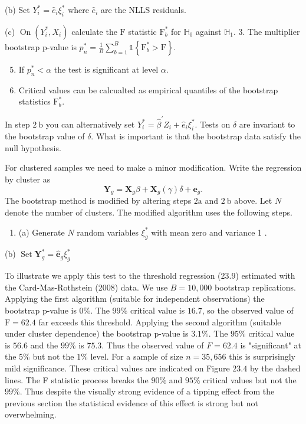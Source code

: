 \documentclass[10pt]{article}
\begin{document}
(b) Set $Y_{i}^{*}=\widehat{e}_{i} \xi_{i}^{*}$ where $\widehat{e}_{i}$ are the NLLS residuals.

(c) $\operatorname{On}\left(Y_{i}^{*}, X_{i}\right)$ calculate the $\mathrm{F}$ statistic $\mathrm{F}_{b}^{*}$ for $\mathbb{H}_{0}$ against $\mathbb{H}_{1}$. 3. The multiplier bootstrap p-value is $p_{n}^{*}=\frac{1}{B} \sum_{b=1}^{B} \mathbb{1}\left\{\mathrm{F}_{b}^{*}>\mathrm{F}\right\}$.

\begin{enumerate}
  \setcounter{enumi}{4}
  \item If $p_{n}^{*}<\alpha$ the test is significant at level $\alpha$.

  \item Critical values can be calcualted as empirical quantiles of the bootstrap statistics $\mathrm{F}_{b}^{*}$.

\end{enumerate}
In step $2 \mathrm{~b}$ you can alternatively set $Y_{i}^{*}=\widehat{\beta}^{\prime} Z_{i}+\widehat{e}_{i} \xi_{i}^{*}$. Tests on $\delta$ are invariant to the bootstrap value of $\delta$. What is important is that the bootstrap data satisfy the null hypothesis.

For clustered samples we need to make a minor modification. Write the regression by cluster as
$$
\boldsymbol{Y}_{g}=\boldsymbol{X}_{g} \beta+\boldsymbol{X}_{g}(\gamma) \delta+\boldsymbol{e}_{g} .
$$
The bootstrap method is modified by altering steps $2 \mathrm{a}$ and $2 \mathrm{~b}$ above. Let $N$ denote the number of clusters. The modified algorithm uses the following steps.

\begin{enumerate}
  \item (a) Generate $N$ random variables $\xi_{g}^{*}$ with mean zero and variance 1 .
\end{enumerate}
(b) $\operatorname{Set} \boldsymbol{Y}_{g}^{*}=\widehat{\boldsymbol{e}}_{g} \xi_{g}^{*}$

To illustrate we apply this test to the threshold regression (23.9) estimated with the Card-Mas-Rothstein (2008) data. We use $B=10,000$ bootstrap replications. Applying the first algorithm (suitable for independent observations) the bootstrap p-value is $0 \%$. The $99 \%$ critical value is $16.7$, so the observed value of $\mathrm{F}=62.4$ far exceeds this threshold. Applying the second algorithm (suitable under cluster dependence) the bootstrap p-value is $3.1 \%$. The $95 \%$ critical value is $56.6$ and the $99 \%$ is $75.3$. Thus the observed value of $F=62.4$ is "significant" at the $5 \%$ but not the $1 \%$ level. For a sample of size $n=35,656$ this is surprisingly mild significance. These critical values are indicated on Figure $23.4$ by the dashed lines. The F statistic process breaks the $90 \%$ and $95 \%$ critical values but not the $99 \%$. Thus despite the visually strong evidence of a tipping effect from the previous section the statistical evidence of this effect is strong but not overwhelming.
\end{document}

